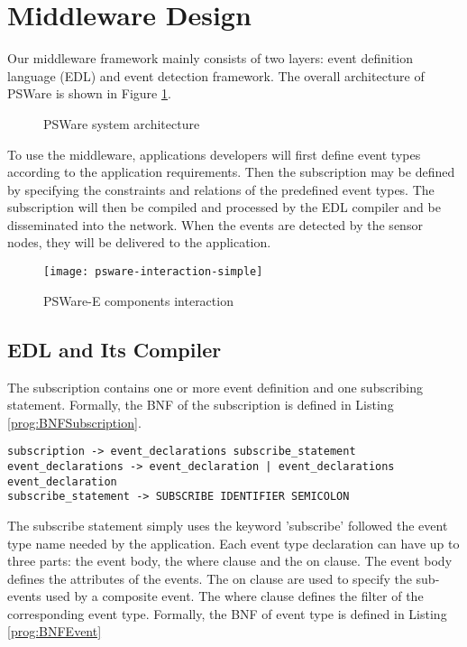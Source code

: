 \section{Middleware Design}
\label{sec:design}

Our middleware framework mainly consists of two layers: event definition language (EDL) and event detection framework. The overall architecture of PSWare is shown in Figure \ref{fig:psware-architecture}.

\begin{figure}
\centering
{}
\caption{PSWare system architecture}
\label{fig:psware-architecture}
\end{figure}

To use the middleware, applications developers will first define event types according to the application requirements. Then the subscription may be defined by specifying the constraints and relations of the predefined event types. The subscription will then be compiled and processed by the EDL compiler and be disseminated into the network. When the events are detected by the sensor nodes, they will be delivered to the application.

\begin{figure*}
\centering
\texttt{[image: psware-interaction-simple]}
\caption{PSWare-E components interaction}
\label{fig:psware-interaction-simple}
\end{figure*}

\subsection{EDL and Its Compiler}
The subscription contains one or more event definition and one subscribing statement. Formally, the BNF of the subscription is defined in Listing \ref{prog:BNFSubscription}.

\begin{lstlisting}[caption=BNF (simplified) of subscription, label=prog:BNFSubscription]
subscription -> event_declarations subscribe_statement
event_declarations -> event_declaration | event_declarations event_declaration
subscribe_statement -> SUBSCRIBE IDENTIFIER SEMICOLON
\end{lstlisting}

The subscribe statement simply uses the keyword 'subscribe' followed the event type name needed by the application. Each event type declaration can have up to three parts: the event body, the where clause and the on clause. The event body defines the attributes of the events. The on clause are used to specify the sub-events used by a composite event. The where clause defines the filter of the corresponding event type. Formally, the BNF of event type is defined in Listing \ref{prog:BNFEvent}

